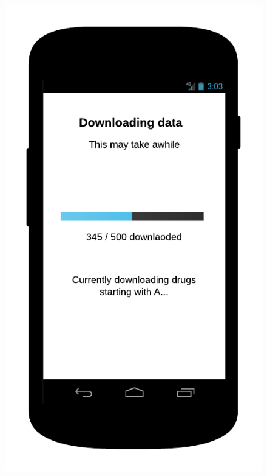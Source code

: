 \begin{figure}
\begin{minipage}{.5\textwidth}
  \includegraphics[width=.7\linewidth]{Images/mockups/download.png}
\end{minipage}
\end{figure}

